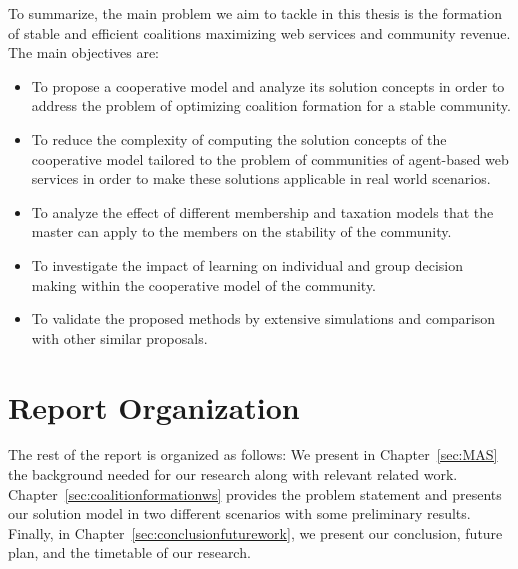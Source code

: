 \indent To summarize, the main problem we aim to tackle in this
thesis is the formation of stable and efficient coalitions
maximizing web services and community revenue. The main objectives
are:
\begin{itemize}
\item To propose a cooperative model and analyze its solution
concepts in order to address the problem of optimizing coalition
formation for a stable community.

\item To reduce the complexity of computing the solution concepts
of the cooperative model tailored to the problem of communities of
agent-based web services in order to make these solutions
applicable in real world scenarios.

\item To analyze the effect of different membership and taxation
models that the master can apply to the members on the stability
of the community.

\item To investigate the impact of learning on individual and
group decision making within the cooperative model of the
community.

\item To validate the proposed methods by extensive simulations
and comparison with other similar proposals.
\end{itemize}




\section{Report Organization}\label{sec:outline}
The rest of the report is organized as follows: We present in
Chapter~\ref{sec:MAS} the background needed for our research along
with relevant related work. Chapter~\ref{sec:coalitionformationws}
provides the problem statement and presents our solution model in
two different scenarios with some preliminary results. Finally, in
Chapter~\ref{sec:conclusionfuturework}, we present our conclusion,
future plan, and the timetable of our research.
